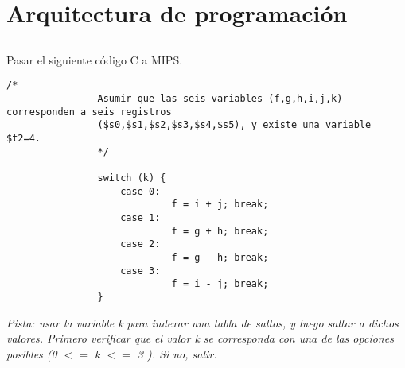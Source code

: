 \section{Arquitectura de programación}
\subsection{}
	  Pasar el siguiente código C a MIPS.
		\begin{small}
			\begin{lstlisting}[style=6620C]
				/*
                Asumir que las seis variables (f,g,h,i,j,k) corresponden a seis registros 
				($s0,$s1,$s2,$s3,$s4,$s5), y existe una variable $t2=4.
                */
				 
				switch (k) {
					case 0:
				             f = i + j; break; 
					case 1:
				             f = g + h; break;
					case 2:
				             f = g - h; break; 
					case 3:
				             f = i - j; break; 
				}
			\end{lstlisting}
		\end{small}
		\textit{Pista: usar la variable k para indexar una tabla de saltos, y luego 
		saltar a dichos valores.
		Primero verificar que el valor k se corresponda con una de las opciones posibles
		(0 \(<=\) k \(<=\) 3 ). Si no, salir.}
	 \vfill	

